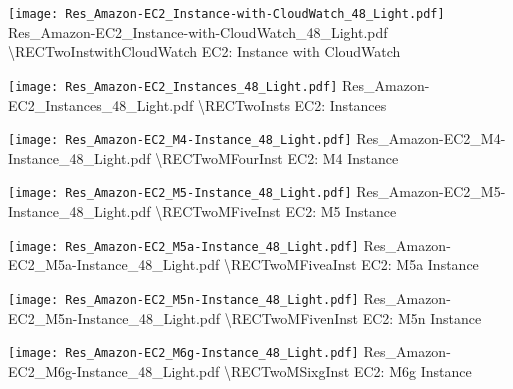  {\texttt{[image: Res\_Amazon-EC2\_Instance-with-CloudWatch\_48\_Light.pdf]}} {Res\_Amazon-EC2\_Instance-with-CloudWatch\_48\_Light.pdf} {{\textbackslash}RECTwoInstwithCloudWatch} {EC2: Instance with CloudWatch}

 {\texttt{[image: Res\_Amazon-EC2\_Instances\_48\_Light.pdf]}} {Res\_Amazon-EC2\_Instances\_48\_Light.pdf} {{\textbackslash}RECTwoInsts} {EC2: Instances}

 {\texttt{[image: Res\_Amazon-EC2\_M4-Instance\_48\_Light.pdf]}} {Res\_Amazon-EC2\_M4-Instance\_48\_Light.pdf} {{\textbackslash}RECTwoMFourInst} {EC2: M4 Instance}

 {\texttt{[image: Res\_Amazon-EC2\_M5-Instance\_48\_Light.pdf]}} {Res\_Amazon-EC2\_M5-Instance\_48\_Light.pdf} {{\textbackslash}RECTwoMFiveInst} {EC2: M5 Instance}

 {\texttt{[image: Res\_Amazon-EC2\_M5a-Instance\_48\_Light.pdf]}} {Res\_Amazon-EC2\_M5a-Instance\_48\_Light.pdf} {{\textbackslash}RECTwoMFiveaInst} {EC2: M5a Instance}

 {\texttt{[image: Res\_Amazon-EC2\_M5n-Instance\_48\_Light.pdf]}} {Res\_Amazon-EC2\_M5n-Instance\_48\_Light.pdf} {{\textbackslash}RECTwoMFivenInst} {EC2: M5n Instance}

 {\texttt{[image: Res\_Amazon-EC2\_M6g-Instance\_48\_Light.pdf]}} {Res\_Amazon-EC2\_M6g-Instance\_48\_Light.pdf} {{\textbackslash}RECTwoMSixgInst} {EC2: M6g Instance}

